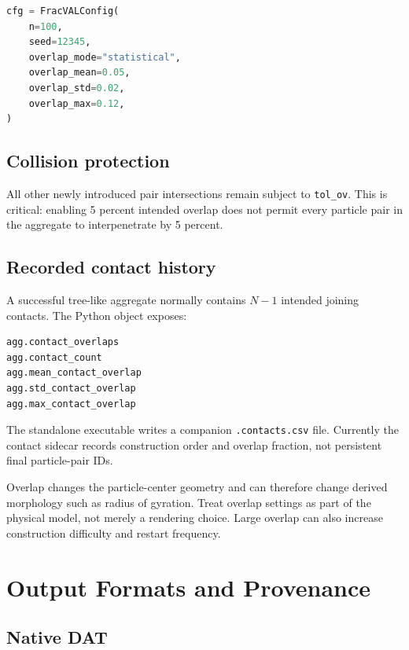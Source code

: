 \documentclass[11pt,oneside]{report}
\newcommand{\code}[1]{\texttt{#1}}
\begin{document}
\begin{lstlisting}[language=Python]
cfg = FracVALConfig(
    n=100,
    seed=12345,
    overlap_mode="statistical",
    overlap_mean=0.05,
    overlap_std=0.02,
    overlap_max=0.12,
)
\end{lstlisting}

\section{Collision protection}

All other newly introduced pair intersections remain subject to \code{tol\_ov}.
This is critical: enabling 5 percent intended overlap does not permit every
particle pair in the aggregate to interpenetrate by 5 percent.

\section{Recorded contact history}

A successful tree-like aggregate normally contains \(N-1\) intended joining
contacts. The Python object exposes:

\begin{lstlisting}[language=Python]
agg.contact_overlaps
agg.contact_count
agg.mean_contact_overlap
agg.std_contact_overlap
agg.max_contact_overlap
\end{lstlisting}

The standalone executable writes a companion \code{.contacts.csv} file.
Currently the contact sidecar records construction order and overlap fraction,
not persistent final particle-pair IDs.

\begin{warningbox}
Overlap changes the particle-center geometry and can therefore change derived
morphology such as radius of gyration. Treat overlap settings as part of the
physical model, not merely a rendering choice. Large overlap can also increase
construction difficulty and restart frequency.
\end{warningbox}

\chapter{Output Formats and Provenance}

\section{Native DAT}
\end{document}
